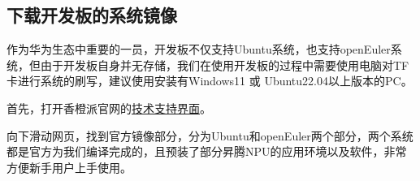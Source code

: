 \begin{enumerate}
\end{enumerate}

\subsection{下载开发板的系统镜像}\label{ux4e0bux8f7dux5f00ux53d1ux677fux7684ux7cfbux7edfux955cux50cf}

作为华为生态中重要的一员，开发板不仅支持Ubuntu系统，也支持openEuler系统，但由于开发板自身并无存储，我们在使用开发板的过程中需要使用电脑对TF卡进行系统的刷写，建议使用安装有Windows11
或 Ubuntu22.04以上版本的PC。

首先，打开香橙派官网的\href{http://www.orangepi.cn/html/hardWare/computerAndMicrocontrollers/service-and-support/Orange-Pi-AIpro.html}{技术支持界面}。

向下滑动网页，找到官方镜像部分，分为Ubuntu和openEuler两个部分，两个系统都是官方为我们编译完成的，且预装了部分昇腾NPU的应用环境以及软件，非常方便新手用户上手使用。

